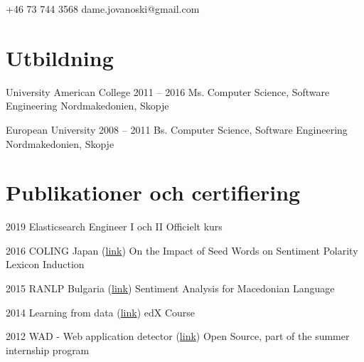 \documentclass{tccv}
\begin{document}
    {+46 73 744 3568}
    {dame.jovanoski@gmail.com}

\section{Utbildning}

\begin{yearlist}

\item[University American College]{2011 -- 2016}
     {Ms. Computer Science, Software Engineering}
     {Nordmakedonien, Skopje}

\item[European University]{2008 -- 2011}
     {Bs. Computer Science, Software Engineering}
     {Nordmakedonien, Skopje}     

\end{yearlist}

\section{Publikationer och certifiering}

\begin{yearlist}

\item{2019}
    {Elasticsearch Engineer I och II}
    {Officielt kurs}


\item{2016}
     {COLING Japan (\href{https://pdfs.semanticscholar.org/5ea2/7e860d62a6a13f53aa0ce6fddf973e8db74d.pdf}{link})}
     {On the Impact of Seed Words on Sentiment Polarity Lexicon Induction}

\item{2015}
     {RANLP Bulgaria (\href{https://pdfs.semanticscholar.org/929c/dabe46cb82c39635558397d6032378845d03.pdf}{link})}
     {Sentiment Analysis for Macedonian Language}
     
\item{2014}
     {Learning from data (\href{https://s3.amazonaws.com/verify.edx.org/downloads/551392b3d221407cb2794ccc7f71d30d/Certificate.pdf}{link})}
     {edX Course}
     
\item{2012}
   {WAD - Web application detector (\href{https://github.com/CERN-CERT/WAD}{link})}
   {Open Source, part of the summer internship program}

\end{yearlist}
\end{document}
